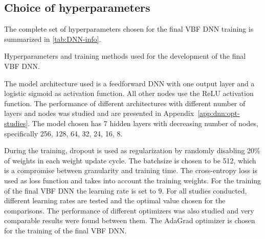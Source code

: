 \subsection{Choice of hyperparameters}
\label{subsec:hyper-parameters}
The complete set of hyperparameters chosen for the final VBF DNN training is summarized in \cref{tab:DNN-info}. 
\begin{table}[t]
    \begin{center}
        
    \end{center}
    \caption[Hyperparameters and training methods for the VBF DNN.]{Hyperparameters and training methods used for the development of the final VBF DNN.
    }
    \label{tab:DNN-info}
\end{table}
The model architecture used is a feedforward DNN with one output layer and a logistic sigmoid as activation function. All other nodes use the ReLU activation function.
The performance of different architectures with different number of layers and nodes was studied and are presented in Appendix~\ref{app:dnn:opt-studies}.
The model chosen has 7 hidden layers with decreasing number of nodes, specifically {256, 128, 64, 32, 24, 16, 8}.

During the training, dropout is used as regularization by randomly disabling 20\% of weights in each weight update cycle.
The batchsize is chosen to be 512, which is a compromise between granularity and training time.
The cross-entropy loss is used as loss function and takes into account the training weights.
For the training of the final VBF DNN the learning rate is set to 9. For all studies conducted, different learning rates are tested and the optimal value chosen for the comparisons. 
The performance of different optimizers was also studied and very comparable results were found between them.
The AdaGrad optimizer is chosen for the training of the final VBF DNN.

